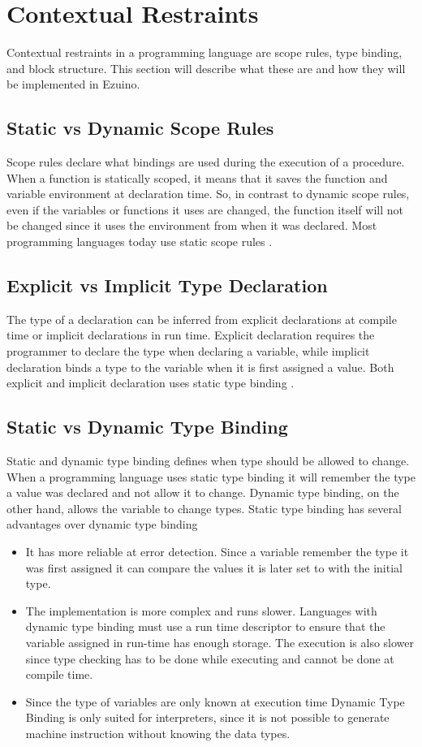 \section{Contextual Restraints}
Contextual restraints in a programming language are scope rules, type binding, and block structure. This section will describe what these are and how they will be implemented in Ezuino.
\subsection{Static vs Dynamic Scope Rules}
Scope rules declare what bindings are used during the execution of a procedure.
When a function is statically scoped, it means that it saves the function and variable environment at declaration time. So, in contrast to dynamic scope rules, even if the variables or functions it uses are changed, the function itself will not be changed since it uses the environment from when it was declared. Most programming languages today use static scope rules \cite{syntax-and-semantics}. %
\subsection{Explicit vs Implicit Type Declaration}
The type of a declaration can be inferred from explicit declarations at compile time or implicit declarations in run time. Explicit declaration requires the programmer to declare the type when declaring a variable, while implicit declaration binds a type to the variable when it is first assigned a value. Both explicit and implicit declaration uses static type binding \cite{conceptsOfProgrammingLanguages}.

\subsection{Static vs Dynamic Type Binding}
Static and dynamic type binding defines when type should be allowed to change. When a programming language uses static type binding it will remember the type a value was declared and not allow it to change. Dynamic type binding, on the other hand, allows the variable to change types\cite{conceptsOfProgrammingLanguages}.
Static type binding has several advantages over dynamic type binding
\begin{itemize}
    \item It has more reliable at error detection. Since a variable remember the type it was first assigned it can compare the values it is later set to with the initial type.
    \item The implementation is more complex and runs slower. Languages with dynamic type binding must use a run time descriptor to ensure that the variable assigned in run-time has enough storage.
    The execution is also slower since type checking has to be done while executing and cannot be done at compile time.
    \item Since the type of variables are only known at execution time Dynamic Type Binding is only suited for interpreters, since it is not possible to generate machine instruction without knowing the data types.
\end{itemize}
